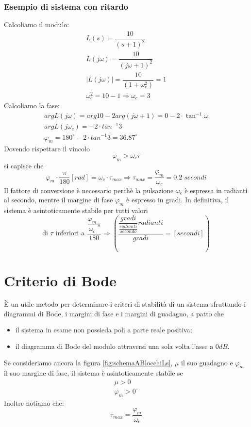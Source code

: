 \documentclass[a4paper]{report}
\begin{document}
\subsubsection{Esempio di sistema con ritardo}
Calcoliamo il modulo:
\[
\begin{array}{l}
  L(s) = \dfrac{10}{(s + 1)^2}\\
  L(j \omega) = \dfrac{10}{(j \omega +1)^2}\\
  |L(j \omega)| = \dfrac{10}{(1 + \omega_c^2)} = 1\\
  \omega_c^2 = 10 -1 \Rightarrow \omega_c = 3
\end{array}
\]
Calcoliamo la fase:
\[
\begin{array}{l}
  arg L(j \omega) = arg 10 - 2 arg (j \omega + 1) = 0 - 2\cdot \tan^{-1}
  \omega\\
  arg L(j \omega_c) = -2 \cdot tan^{-1} 3\\
  \varphi_m = 180^{\circ} - 2 \cdot tan^{-1} 3 = 36.87^{\circ}
\end{array}
\]
Dovendo rispettare il vincolo
\[
\varphi_m > \omega_c \tau
\]
si capisce che
\[
\varphi_m \cdot \dfrac{\pi}{180} [rad] = \omega_c \cdot \tau_{max}
\Rightarrow \tau_{max} = \dfrac{\varphi_m}{\omega_c} = 0.2\; secondi
\]
Il fattore di conversione \`e necessario perch\`e la pulsazione
$\omega_c$ \`e espressa in radianti al secondo, mentre il margine di
fase $\varphi_m$ \`e espresso in gradi. In definitiva, il sistema \`e
asintoticamente stabile per tutti valori
\[
\textrm{di } \tau \textrm{ inferiori a }
\dfrac{\dfrac{\varphi_m}{\omega_c}\pi}{180} \Rightarrow \left(
\dfrac{\dfrac{gradi}{\frac{radianti}{secondo}}radianti}{gradi} =
      [secondi]\right)
      \]
\section{Criterio di Bode}\label{criterioDiBode}
\`E un utile metodo per determinare i criteri di stabilit\`a di un
sistema sfruttando i diagrammi di Bode, i margini di fase e i margini
di guadagno, a patto che
\begin{itemize}
\item il sistema in esame non possieda poli a parte reale positiva;
\item il diagramma di Bode del modulo attraversi una sola volta l'asse
  a $0 dB$.
\end{itemize}
Se consideriamo ancora la figura \ref{fig:schemaABlocchiLs}, $\mu$ il
suo guadagno e $\varphi_m$ il suo margine di fase, il sistema \`e
asintoticamente stabile se
\[
\begin{array}{l}
  \mu > 0\\
  \varphi_m > 0^{\circ}
\end{array}
\]
Inoltre notiamo che:
\[
\tau_{max} = \dfrac{\varphi_m}{\omega_c}
\]
\end{document}
